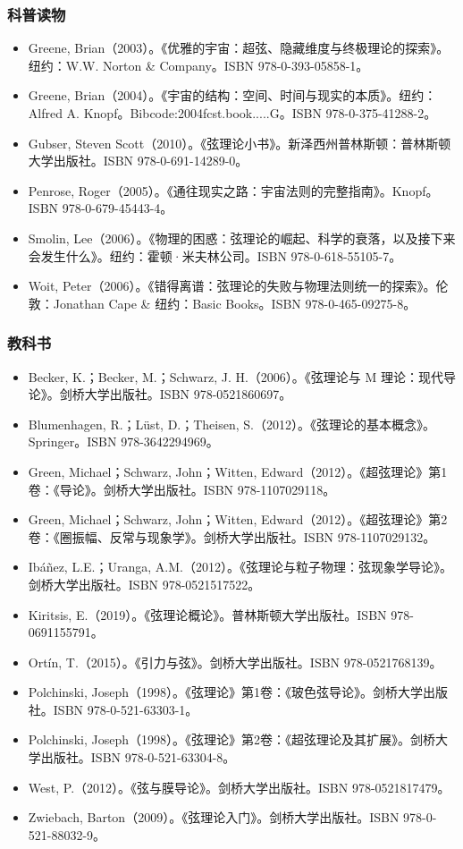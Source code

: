\subsubsection{科普读物} 
\begin{itemize}
\item Greene, Brian（2003）。《优雅的宇宙：超弦、隐藏维度与终极理论的探索》。纽约：W.W. Norton & Company。ISBN 978-0-393-05858-1。  
\item Greene, Brian（2004）。《宇宙的结构：空间、时间与现实的本质》。纽约：Alfred A. Knopf。Bibcode:2004fcst.book.....G。ISBN 978-0-375-41288-2。  
\item Gubser, Steven Scott（2010）。《弦理论小书》。新泽西州普林斯顿：普林斯顿大学出版社。ISBN 978-0-691-14289-0。  
\item Penrose, Roger（2005）。《通往现实之路：宇宙法则的完整指南》。Knopf。ISBN 978-0-679-45443-4。  
\item Smolin, Lee（2006）。《物理的困惑：弦理论的崛起、科学的衰落，以及接下来会发生什么》。纽约：霍顿·米夫林公司。ISBN 978-0-618-55105-7。  
\item Woit, Peter（2006）。《错得离谱：弦理论的失败与物理法则统一的探索》。伦敦：Jonathan Cape & 纽约：Basic Books。ISBN 978-0-465-09275-8。
\end{itemize}
\subsubsection{教科书} 
\begin{itemize}
\item Becker, K.；Becker, M.；Schwarz, J. H.（2006）。《弦理论与 M 理论：现代导论》。剑桥大学出版社。ISBN 978-0521860697。  
\item Blumenhagen, R.；Lüst, D.；Theisen, S.（2012）。《弦理论的基本概念》。Springer。ISBN 978-3642294969。  
\item Green, Michael；Schwarz, John；Witten, Edward（2012）。《超弦理论》第1卷：《导论》。剑桥大学出版社。ISBN 978-1107029118。  
\item Green, Michael；Schwarz, John；Witten, Edward（2012）。《超弦理论》第2卷：《圈振幅、反常与现象学》。剑桥大学出版社。ISBN 978-1107029132。  
\item Ibáñez, L.E.；Uranga, A.M.（2012）。《弦理论与粒子物理：弦现象学导论》。剑桥大学出版社。ISBN 978-0521517522。  
\item Kiritsis, E.（2019）。《弦理论概论》。普林斯顿大学出版社。ISBN 978-0691155791。  
\item Ortín, T.（2015）。《引力与弦》。剑桥大学出版社。ISBN 978-0521768139。  
\item Polchinski, Joseph（1998）。《弦理论》第1卷：《玻色弦导论》。剑桥大学出版社。ISBN 978-0-521-63303-1。  
\item Polchinski, Joseph（1998）。《弦理论》第2卷：《超弦理论及其扩展》。剑桥大学出版社。ISBN 978-0-521-63304-8。  
\item West, P.（2012）。《弦与膜导论》。剑桥大学出版社。ISBN 978-0521817479。  
\item Zwiebach, Barton（2009）。《弦理论入门》。剑桥大学出版社。ISBN 978-0-521-88032-9。
\end{itemize}